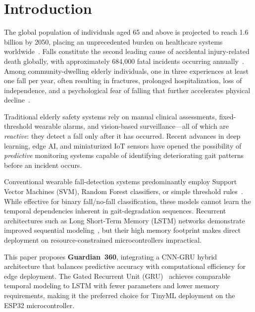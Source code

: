\documentclass[conference]{IEEEtran}
\begin{document}
\section{Introduction}

The global population of individuals aged 65 and above is projected to
reach 1.6 billion by 2050, placing an unprecedented burden on healthcare
systems worldwide~\cite{who2021falls}. Falls constitute the second leading
cause of accidental injury-related death globally, with approximately
684{,}000 fatal incidents occurring annually~\cite{ishaq2026}. Among
community-dwelling elderly individuals, one in three experiences at least
one fall per year, often resulting in fractures, prolonged hospitalization,
loss of independence, and a psychological fear of falling that further
accelerates physical decline~\cite{attal2015}.

Traditional elderly safety systems rely on manual clinical assessments,
fixed-threshold wearable alarms, and vision-based surveillance---all of
which are \textit{reactive}: they detect a fall only after it has occurred.
Recent advances in deep learning, edge AI, and miniaturized IoT sensors
have opened the possibility of \textit{predictive} monitoring systems
capable of identifying deteriorating gait patterns before an incident occurs.

Conventional wearable fall-detection systems predominantly employ Support
Vector Machines (SVM), Random Forest classifiers, or simple threshold
rules~\cite{kumar2024,zhang2025}. While effective for binary fall/no-fall
classification, these models cannot learn the temporal dependencies
inherent in gait-degradation sequences. Recurrent architectures such as
Long Short-Term Memory (LSTM) networks demonstrate improved sequential
modeling~\cite{gaud2025}, but their high memory footprint makes direct
deployment on resource-constrained microcontrollers impractical.

This paper proposes \textbf{Guardian~360}, integrating a CNN-GRU hybrid
architecture that balances predictive accuracy with computational
efficiency for edge deployment. The Gated Recurrent Unit
(GRU)~\cite{cho2014} achieves comparable temporal modeling to LSTM with
fewer parameters and lower memory requirements, making it the preferred
choice for TinyML deployment on the ESP32 microcontroller.
\end{document}
